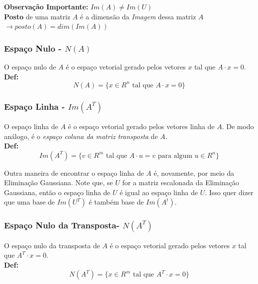 \documentclass[12pt]{article}
\begin{document}
\textbf{Observação Importante:} $Im(A)\neq Im(U)$\\

\textbf{Posto} de uma matriz $A$ é a dimensão da \textit{Imagem} dessa matriz $A$ $\rightarrow posto(A)=dim(Im(A))$

\subsubsection{Espaço Nulo - $N(A)$}

O espaço nulo de $A$ é o espaço vetorial gerado pelos vetores $x$ tal que $A\cdot x=0$.\\

\textbf{Def:}
\begin{equation*}
	N(A)=\{x \in R^n \mbox{ tal que }A\cdot x=0\}
\end{equation*}

\subsubsection{Espaço Linha - $Im(A^T)$}

O espaço linha de $A$ é o espaço vetorial gerado pelos vetores linha de $A$. De modo análogo, é o\textit{ espaço coluna da matriz transposta} de $A$.\\

\textbf{Def:}
\begin{equation*}
	Im(A^T)=\{v \in R^m \mbox{ tal que } A\cdot u=v \mbox{ para algum }u\in R^n\}
\end{equation*}

Outra maneira de encontrar o espaço linha de $A$ é, novamente, por meio da Eliminação Gaussiana. Note que, se $U$ for a matriz escalonada da Eliminação Gaussiana, então o espaço linha de $U$ é igual ao espaço linha de $U$. Isso quer dizer que uma base de $Im(U^T)$ é também base de $Im(A^t)$.

\subsubsection{Espaço Nulo da Transposta- $N(A^T)$}

O espaço nulo da transposta de $A$ é o espaço vetorial gerado pelos vetores $x$ tal que $A^T\cdot x=0$.\\

\textbf{Def:}
\begin{equation*}
	N(A^T)=\{x \in R^m \mbox{ tal que }A^T\cdot x=0\}
\end{equation*}
\end{document}
